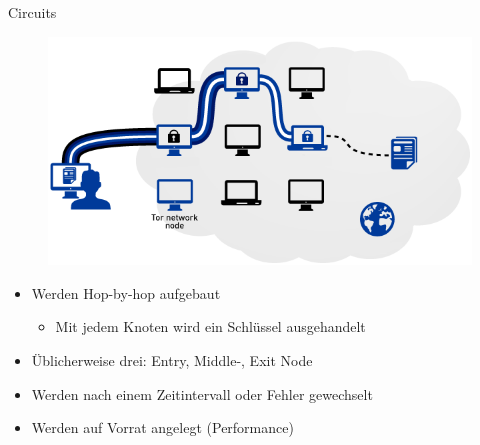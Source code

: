\documentclass{beamer}
\begin{document}


\begin{frame}{Circuits}{\secname}
  \begin{figure}
    \includegraphics[width=.7\textwidth]{pics/tor}
  \end{figure}
  \begin{itemize}
    \item Werden Hop-by-hop aufgebaut
    \begin{itemize}
      \item Mit jedem Knoten wird ein Schlüssel ausgehandelt
    \end{itemize}
    \item Üblicherweise drei: Entry\-, Middle-, Exit Node
    \item Werden nach einem Zeitintervall oder Fehler gewechselt
    \item Werden auf Vorrat angelegt (Performance)
  \end{itemize}
\end{frame}
\end{document}
